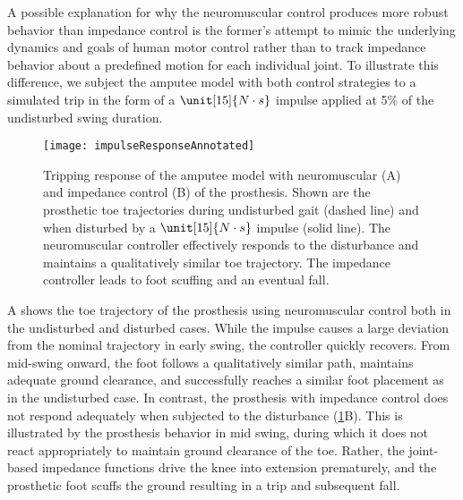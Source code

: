 A possible explanation for why the neuromuscular control produces more robust
behavior than impedance control is the former's attempt to mimic the underlying
dynamics and goals of human motor control rather than to track impedance
behavior about a predefined motion for each individual joint. To illustrate this
difference, we subject the amputee model with both control strategies to a
simulated trip in the form of a $\unit[15]{N \cdot s}$ impulse applied at 5\% of
the undisturbed swing duration. 

\begin{figure*}[t]
    \centering
    \texttt{[image: impulseResponseAnnotated]}
    \caption{Tripping response of the amputee model with neuromuscular (A) and
    impedance control (B) of the prosthesis. Shown are the prosthetic toe
    trajectories during undisturbed gait (dashed line) and when disturbed by a
    $\unit[15]{N \cdot s}$ impulse (solid line). The neuromuscular controller
    effectively responds to the disturbance and maintains a qualitatively
    similar toe trajectory. The impedance controller leads to foot scuffing and
    an eventual fall.
    }\label{fig:ImpulseResponses}
\end{figure*}

A shows the toe trajectory of the prosthesis using
neuromuscular control both in the undisturbed and disturbed cases. While the
impulse causes a large deviation from the nominal trajectory in early swing, the
controller quickly recovers. From mid-swing onward, the foot follows a
qualitatively similar path, maintains adequate ground clearance, and
successfully reaches a similar foot placement as in the undisturbed case. In
contrast, the prosthesis with impedance control does not respond adequately when
subjected to the disturbance (\cref{fig:ImpulseResponses}B). This is illustrated
by the prosthesis behavior in mid swing, during which it does not react
appropriately to maintain ground clearance of the toe. Rather, the joint-based
impedance functions drive the knee into extension prematurely, and the
prosthetic foot scuffs the ground resulting in a trip and subsequent fall.
